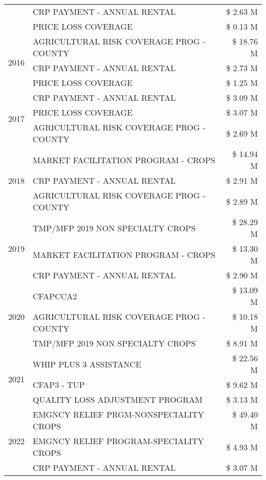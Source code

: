\begin{tabular}{llr}
 & CRP PAYMENT - ANNUAL RENTAL & \$ 2.63 M \\
 & PRICE LOSS COVERAGE & \$ 0.13 M \\
\cline{1-3}
\multirow[t]{3}{*}{2016} & AGRICULTURAL RISK COVERAGE PROG - COUNTY & \$ 18.76 M \\
 & CRP PAYMENT - ANNUAL RENTAL & \$ 2.73 M \\
 & PRICE LOSS COVERAGE & \$ 1.25 M \\
\cline{1-3}
\multirow[t]{3}{*}{2017} & CRP PAYMENT - ANNUAL RENTAL & \$ 3.09 M \\
 & PRICE LOSS COVERAGE & \$ 3.07 M \\
 & AGRICULTURAL RISK COVERAGE PROG - COUNTY & \$ 2.69 M \\
\cline{1-3}
\multirow[t]{3}{*}{2018} & MARKET FACILITATION PROGRAM - CROPS & \$ 14.94 M \\
 & CRP PAYMENT - ANNUAL RENTAL & \$ 2.91 M \\
 & AGRICULTURAL RISK COVERAGE PROG - COUNTY & \$ 2.89 M \\
\cline{1-3}
\multirow[t]{3}{*}{2019} & TMP/MFP 2019 NON SPECIALTY CROPS & \$ 28.29 M \\
 & MARKET FACILITATION PROGRAM - CROPS & \$ 13.30 M \\
 & CRP PAYMENT - ANNUAL RENTAL & \$ 2.90 M \\
\cline{1-3}
\multirow[t]{3}{*}{2020} & CFAPCCA2 & \$ 13.09 M \\
 & AGRICULTURAL RISK COVERAGE PROG - COUNTY & \$ 10.18 M \\
 & TMP/MFP 2019 NON SPECIALTY CROPS & \$ 8.91 M \\
\cline{1-3}
\multirow[t]{3}{*}{2021} & WHIP PLUS 3 ASSISTANCE & \$ 22.56 M \\
 & CFAP3 - TUP & \$ 9.62 M \\
 & QUALITY LOSS ADJUSTMENT PROGRAM & \$ 3.13 M \\
\cline{1-3}
\multirow[t]{3}{*}{2022} & EMGNCY RELIEF PRGM-NONSPECIALITY CROPS & \$ 49.40 M \\
 & EMGNCY RELIEF PROGRAM-SPECIALITY CROPS & \$ 4.93 M \\
 & CRP PAYMENT - ANNUAL RENTAL & \$ 3.07 M \\
\cline{1-3}
\bottomrule
\end{tabular}
